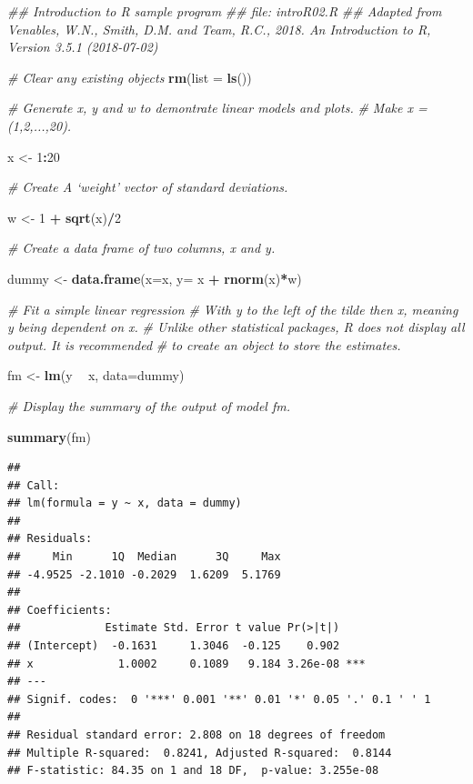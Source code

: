 \documentclass[]{book}
\newenvironment{Shaded}{\begin{snugshade}}{\end{snugshade}}
\newcommand{\CommentTok}[1]{\textcolor[rgb]{0.56,0.35,0.01}{\textit{#1}}}
\newcommand{\DataTypeTok}[1]{\textcolor[rgb]{0.13,0.29,0.53}{#1}}
\newcommand{\DecValTok}[1]{\textcolor[rgb]{0.00,0.00,0.81}{#1}}
\newcommand{\KeywordTok}[1]{\textcolor[rgb]{0.13,0.29,0.53}{\textbf{#1}}}
\newcommand{\NormalTok}[1]{#1}
\newcommand{\OperatorTok}[1]{\textcolor[rgb]{0.81,0.36,0.00}{\textbf{#1}}}
\newcommand{\StringTok}[1]{\textcolor[rgb]{0.31,0.60,0.02}{#1}}
\begin{document}
\begin{Shaded}
\begin{Highlighting}[]
\CommentTok{## Introduction to R sample program }
\CommentTok{## file: introR02.R}
\CommentTok{## Adapted from Venables, W.N., Smith, D.M. and Team, R.C., 2018. An Introduction to R, Version 3.5.1 (2018-07-02)}


\CommentTok{# Clear any existing objects }
\KeywordTok{rm}\NormalTok{(}\DataTypeTok{list =} \KeywordTok{ls}\NormalTok{())}

\CommentTok{# Generate x, y and w to demontrate linear models and plots.}
\CommentTok{# Make x = (1,2,...,20).}

\NormalTok{x <-}\StringTok{ }\DecValTok{1}\OperatorTok{:}\DecValTok{20}

\CommentTok{# Create A ‘weight’ vector of standard deviations.}

\NormalTok{w <-}\StringTok{ }\DecValTok{1} \OperatorTok{+}\StringTok{ }\KeywordTok{sqrt}\NormalTok{(x)}\OperatorTok{/}\DecValTok{2}

\CommentTok{# Create a data frame of two columns, x and y.}

\NormalTok{dummy <-}\StringTok{ }\KeywordTok{data.frame}\NormalTok{(}\DataTypeTok{x=}\NormalTok{x, }\DataTypeTok{y=}\NormalTok{ x }\OperatorTok{+}\StringTok{ }\KeywordTok{rnorm}\NormalTok{(x)}\OperatorTok{*}\NormalTok{w)}

\CommentTok{# Fit a simple linear regression }
\CommentTok{# With y to the left of the tilde then x, meaning y being dependent on x.}
\CommentTok{# Unlike other statistical packages, R does not display all output.  It is recommended}
\CommentTok{# to create an object to store the estimates.}

\NormalTok{fm <-}\StringTok{ }\KeywordTok{lm}\NormalTok{(y }\OperatorTok{~}\StringTok{ }\NormalTok{x, }\DataTypeTok{data=}\NormalTok{dummy) }

\CommentTok{# Display the summary of the output of model fm.}

\KeywordTok{summary}\NormalTok{(fm)}
\end{Highlighting}
\end{Shaded}

\begin{verbatim}
## 
## Call:
## lm(formula = y ~ x, data = dummy)
## 
## Residuals:
##     Min      1Q  Median      3Q     Max 
## -4.9525 -2.1010 -0.2029  1.6209  5.1769 
## 
## Coefficients:
##             Estimate Std. Error t value Pr(>|t|)    
## (Intercept)  -0.1631     1.3046  -0.125    0.902    
## x             1.0002     0.1089   9.184 3.26e-08 ***
## ---
## Signif. codes:  0 '***' 0.001 '**' 0.01 '*' 0.05 '.' 0.1 ' ' 1
## 
## Residual standard error: 2.808 on 18 degrees of freedom
## Multiple R-squared:  0.8241, Adjusted R-squared:  0.8144 
## F-statistic: 84.35 on 1 and 18 DF,  p-value: 3.255e-08
\end{verbatim}
\end{document}
